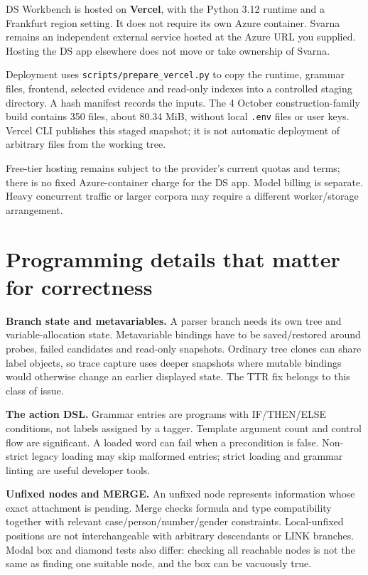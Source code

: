 \documentclass[11pt,a4paper]{article}
\begin{document}
DS Workbench is hosted on \textbf{Vercel}, with the Python 3.12 runtime
and a Frankfurt region setting. It does not require its own Azure
container. Svarna remains an independent external service hosted at the
Azure URL you supplied. Hosting the DS app elsewhere does not move or
take ownership of Svarna.

Deployment uses \nolinkurl{scripts/prepare_vercel.py} to copy the
runtime, grammar files, frontend, selected evidence and read-only
indexes into a controlled staging directory. A hash manifest records the
inputs. The 4 October construction-family build contains 350 files,
about 80.34 MiB, without local \texttt{.env} files or user keys. Vercel
CLI publishes this staged snapshot; it is not automatic deployment of
arbitrary files from the working tree.

Free-tier hosting remains subject to the provider's current quotas and
terms; there is no fixed Azure-container charge for the DS app. Model
billing is separate. Heavy concurrent traffic or larger corpora may
require a different worker/storage arrangement.

\section{Programming details that matter for
correctness}\label{programming-details-that-matter-for-correctness}

\textbf{Branch state and metavariables.} A parser branch needs its own
tree and variable-allocation state. Metavariable bindings have to be
saved/restored around probes, failed candidates and read-only snapshots.
Ordinary tree clones can share label objects, so trace capture uses
deeper snapshots where mutable bindings would otherwise change an
earlier displayed state. The TTR fix belongs to this class of issue.

\textbf{The action DSL.} Grammar entries are programs with IF/THEN/ELSE
conditions, not labels assigned by a tagger. Template argument count and
control flow are significant. A loaded word can fail when a precondition
is false. Non-strict legacy loading may skip malformed entries; strict
loading and grammar linting are useful developer tools.

\textbf{Unfixed nodes and MERGE.} An unfixed node represents information
whose exact attachment is pending. Merge checks formula and type
compatibility together with relevant case/person/number/gender
constraints. Local-unfixed positions are not interchangeable with
arbitrary descendants or LINK branches. Modal box and diamond tests also
differ: checking all reachable nodes is not the same as finding one
suitable node, and the box can be vacuously true.
\end{document}
